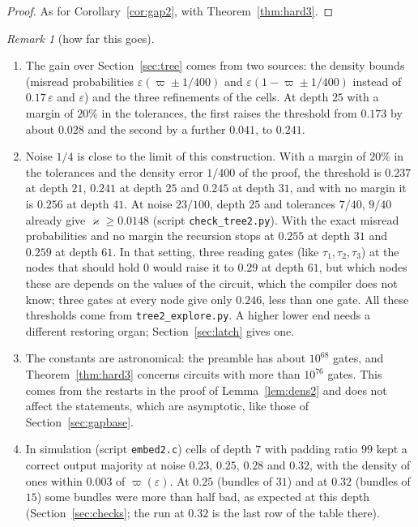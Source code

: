 \documentclass[11pt]{amsart}
\theoremstyle{definition}
\theoremstyle{remark}
\newtheorem{remark}[theorem]{Remark}
\newcommand{\eps}{\varepsilon}
\begin{document}
\begin{proof}
As for Corollary~\ref{cor:gap2}, with Theorem~\ref{thm:hard3}.
\end{proof}

\begin{remark}[how far this goes]\label{rem:limits2}
\begin{enumerate}[label=(\roman*),leftmargin=2.4em]
\item The gain over Section~\ref{sec:tree} comes from two sources: the density bounds (misread
probabilities $\eps(\varpi\pm1/400)$ and $\eps(1-\varpi\pm1/400)$ instead of $0.17\,\eps$ and
$\eps$) and the three refinements of the cells. At depth $25$ with a margin of $20\%$ in the
tolerances, the first raises the threshold from $0.173$ by about $0.028$ and the second by a
further $0.041$, to $0.241$.
\item Noise $1/4$ is close to the limit of this construction. With a margin of $20\%$ in the
tolerances and the density error $1/400$ of the proof, the threshold is $0.237$ at depth $21$,
$0.241$ at depth $25$ and $0.245$ at depth $31$, and with no margin it is $0.256$ at depth $41$. At
noise $23/100$, depth $25$ and tolerances $7/40$, $9/40$ already give $\varkappa\ge0.0148$
(script \texttt{check\_tree2.py}). With the exact misread probabilities and no margin the recursion
stops at $0.255$ at depth $31$ and $0.259$ at depth $61$. In that setting, three reading gates
(like $\tau_1,\tau_2,\tau_3$) at the nodes that should hold $0$ would raise it to $0.29$ at depth
$61$, but which nodes these are depends on the values of the circuit, which the compiler does not
know; three gates at every node give only $0.246$, less than one gate. All these thresholds come
from \texttt{tree2\_explore.py}. A higher lower end needs a different restoring organ;
Section~\ref{sec:latch} gives one.
\item The constants are astronomical: the preamble has about $10^{68}$ gates, and
Theorem~\ref{thm:hard3} concerns circuits with more than $10^{76}$ gates. This comes from the
restarts in the proof of Lemma~\ref{lem:dens2} and does not affect the statements, which are
asymptotic, like those of Section~\ref{sec:gapbase}.
\item In simulation (script \texttt{embed2.c}) cells of depth $7$ with padding ratio $99$ kept a
correct output majority at noise $0.23$, $0.25$, $0.28$ and $0.32$, with the density of ones
within $0.003$ of $\varpi(\eps)$. At $0.25$ (bundles of $31$) and at $0.32$ (bundles of $15$) some
bundles were more than half bad, as expected at this depth (Section~\ref{sec:checks}; the run at
$0.32$ is the last row of the table there).
\end{enumerate}
\end{remark}
\end{document}
